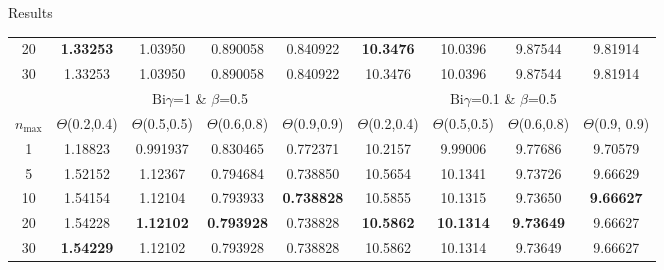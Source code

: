 \documentclass[english,landscape,xcolor=dvipsnames,aspectratio=169]{beamer}
\newcommand{\Bi}{\mathrm{Bi}}
\newcommand{\nmax}{n_{\max}}
\begin{document}
\begin{frame}{Results}
\begin{table}[h!]
\begin{tabular}{|c|c|c|c|c|c|c|c|c|}
		20 &  \bfseries 1.33253 & 1.03950 & 0.890058 & 0.840922 &  \bfseries 10.3476 & 10.0396 & 9.87544 & 9.81914 \\
		30 & 1.33253 & 1.03950 & 0.890058 & 0.840922 & 10.3476 & 10.0396 & 9.87544 & 9.81914 \\
		\hline
		&\multicolumn{4}{|c|}{$\Bi\gamma$=1 \& $\beta$=0.5} & \multicolumn{4}{c|}{$\Bi\gamma$=0.1 \& $\beta$=0.5}\\ \hline
		$\nmax$ & $\Theta$(0.2,0.4)& $\Theta$(0.5,0.5)&  $\Theta$(0.6,0.8)& $\Theta$(0.9,0.9) & $\Theta$(0.2,0.4)& $\Theta$(0.5,0.5)&  $\Theta$(0.6,0.8)& $\Theta$(0.9, 0.9)\\\hline
		1 & 1.18823 & 0.991937 & 0.830465 & 0.772371 & 10.2157 & 9.99006 & 9.77686 & 9.70579 \\
		5 &  1.52152 & 1.12367 & 0.794684 & 0.738850 & 10.5654 & 10.1341 & 9.73726 & 9.66629 \\
		10 &  1.54154 & 1.12104 & 0.793933 &  \bfseries 0.738828 & 10.5855 & 10.1315 & 9.73650 &  \bfseries 9.66627 \\
		20 & 1.54228 &  \bfseries 1.12102 &  \bfseries 0.793928 & 0.738828 &  \bfseries 10.5862 &  \bfseries 10.1314 &  \bfseries 9.73649 & 9.66627 \\
		30 &  \bfseries 1.54229 & 1.12102 & 0.793928 & 0.738828 & 10.5862 & 10.1314 & 9.73649 & 9.66627 \\
		\hline
	\end{tabular}
\end{table} 
\end{frame}
\end{document}
